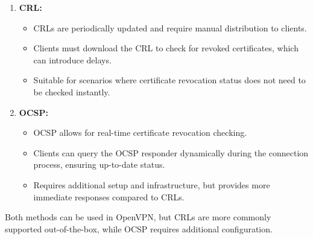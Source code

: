\begin{enumerate}
    \item \textbf{CRL:} 
    \begin{itemize}
        \item CRLs are periodically updated and require manual distribution to clients.
        \item Clients must download the CRL to check for revoked certificates, which can introduce delays.
        \item Suitable for scenarios where certificate revocation status does not need to be checked instantly.
    \end{itemize}

    \item \textbf{OCSP:} 
    \begin{itemize}
        \item OCSP allows for real-time certificate revocation checking.
        \item Clients can query the OCSP responder dynamically during the connection process, ensuring up-to-date status.
        \item Requires additional setup and infrastructure, but provides more immediate responses compared to CRLs.
    \end{itemize}
\end{enumerate}

Both methods can be used in OpenVPN, but CRLs are more commonly supported out-of-the-box, while OCSP requires additional configuration.
